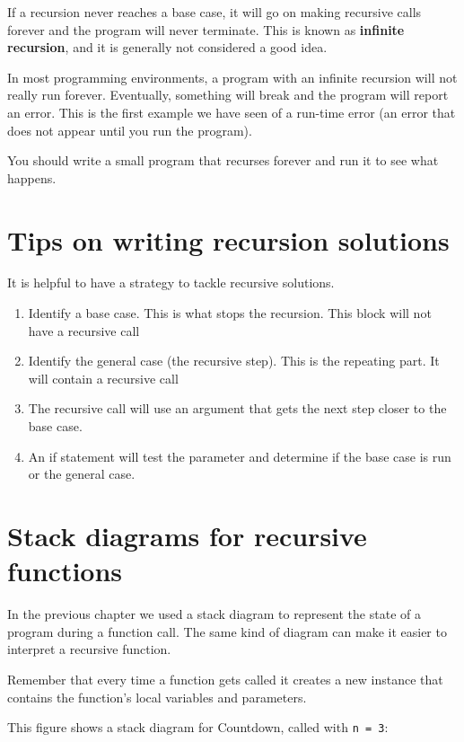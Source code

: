 If a recursion never reaches a base case, it will go on making recursive
calls forever and the program will never terminate.  This is known as
{\bf infinite recursion}, and it is generally not considered a good
idea.


In most programming environments, a program with an infinite
recursion will not really run forever.  Eventually, something
will break and the program will report an error.  This is the
first example we have seen of a run-time error (an error that
does not appear until you run the program).

You should write a small program that recurses forever and run
it to see what happens.

\section {Tips on writing recursion solutions}
It is helpful to have a strategy to tackle recursive solutions. 
\begin{enumerate}
	\item Identify a base case. This is what stops the recursion. This block will not have a recursive call
	\item Identify the general case (the recursive step). This is the repeating part. It will contain a recursive call
	\item The recursive call will use an argument that gets the next step closer to the base case.
	\item An if statement will test the parameter and determine if the base case is run or the general case.
\end{enumerate}

\section {Stack diagrams for recursive functions}

In the previous chapter we used a stack diagram to represent the
state of a program during a function call.  The same kind
of diagram can make it easier to interpret a recursive function.

Remember that every time a function gets called it creates
a new instance that contains
the function's local variables and parameters.

This figure shows a stack diagram for Countdown, called
with {\tt n = 3}:

